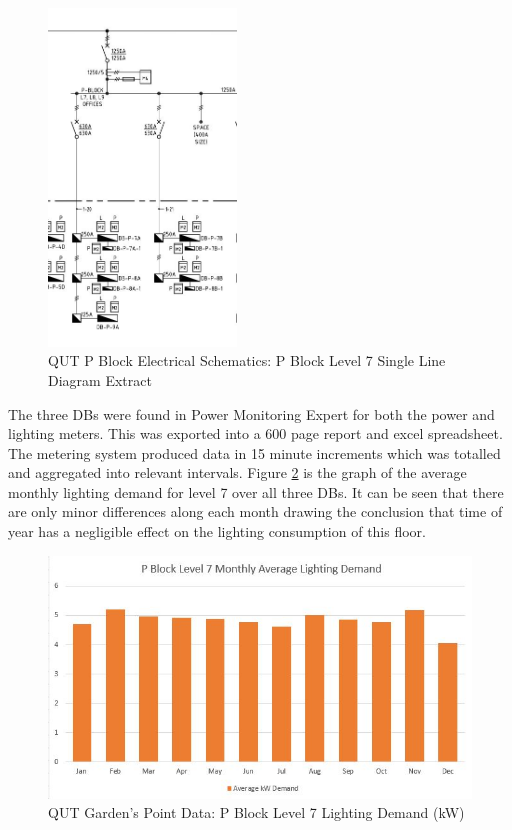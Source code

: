 \begin{figure}[H]
	\hfill\includegraphics[width = 50mm]{images/project-model/qut-lvl7-sld-extract}\hspace*{\fill}
	\caption{QUT P Block Electrical Schematics: P Block Level 7 Single Line Diagram Extract} 
	\label{fig:project-model-pblock-lvl7-sld-extract}
\end{figure}

The three DBs were found in Power Monitoring Expert for both the power and lighting meters. This was exported into a 600 page report and excel spreadsheet. The metering system produced data in 15 minute increments which was totalled and aggregated into relevant intervals. Figure \ref{fig:pblock-lvl7-monthly-kw} is the graph of the average monthly lighting demand for level 7 over all three DBs. It can be seen that there are only minor differences along each month drawing the conclusion that time of year has a negligible effect on the lighting consumption of this floor.  

\begin{figure}[H]
	\hfill\includegraphics[width = 150mm]{images/metering/pme/pblock-lvl7-monthly-kw}\hspace*{\fill}
	\caption{QUT Garden's Point Data: P Block Level 7 Lighting Demand (kW)} 
	\label{fig:pblock-lvl7-monthly-kw}
\end{figure}  

